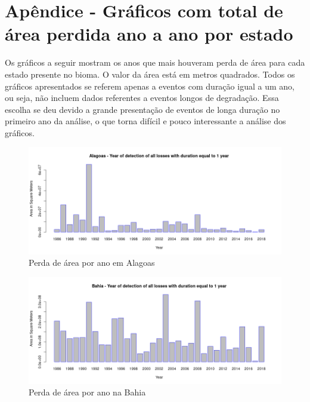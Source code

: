 \appendix 
\section{Apêndice - Gráficos com total de área perdida ano a ano por estado}

\hspace{13pt} Os gráficos a seguir mostram os anos que mais houveram perda de área para cada estado presente no bioma. O valor da área está em metros quadrados. Todos os gráficos apresentados se referem apenas a eventos com duração igual a um ano, ou seja, não incluem dados referentes a eventos longos de degradação. Essa escolha se deu devido a grande presentação de eventos de longa duração no primeiro ano da análise, o que torna difícil e pouco interessante a análise dos gráficos.

\begin{figure}[H]
    \centering
    \includegraphics[scale=.5]{images/loss_graphics/Alagoas_loss_eq1.png}
    \caption{Perda de área por ano em Alagoas}
    \label{fig:loss_alagoas}
\end{figure}

\begin{figure}[H]
    \centering
    \includegraphics[scale=.5]{images/loss_graphics/Bahia_loss_eq1.png}
    \caption{Perda de área por ano na Bahia}
    \label{fig:loss_bahia}
\end{figure}

